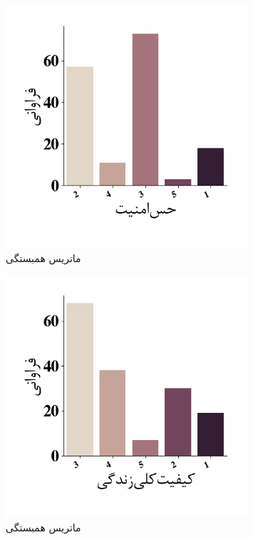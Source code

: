 \begin{figure}[htpb]
    \centering
    \includegraphics[width=0.8\textwidth]{./img/ordinal/SaftyInLifeQuestion.png}
    \caption{ماتریس همبستگی}
    \label{fig:CorrPlotIntervals}
\end{figure}
\begin{figure}[htpb]
    \centering
    \includegraphics[width=0.8\textwidth]{./img/ordinal/TotalQualityOfLife.png}
    \caption{ماتریس همبستگی}
    \label{fig:CorrPlotIntervals}
\end{figure}
